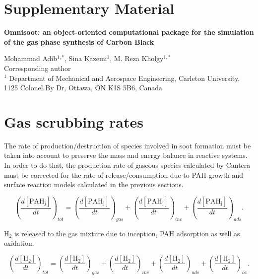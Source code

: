 \section*{Supplementary Material}

\begin{center}
	\vspace*{1cm} %
	\textbf{\LARGE 		Omnisoot: an object-oriented computational package for the simulation of the gas phase synthesis of Carbon Black} 
\end{center}

\begin{center}
	Mohammad Adib$^{1,*}$, Sina Kazemi$^1$, M. Reza Kholgy$^{1,*}$ \\
	{\small *Corresponding author} \\
	$^1$ Department of Mechanical and Aerospace Engineering, Carleton University, 1125 Colonel By Dr, Ottawa, ON K1S 5B6, Canada
\end{center}

\beginsupplement


\section{Gas scrubbing rates}
\label{sec:gasscrub}

The rate of production/destruction of species involved in soot formation must be taken into account to preserve the mass and energy balance in reactive systems. In order to do that, the production rate of gaseous species calculated by Cantera must be corrected for the rate of release/consumption due to PAH growth and surface reaction models calculated in the previous sections.

\begin{equation}
	\left(
	\frac{d\left[{\mathrm{PAH_j}}\right]}{dt}
	\right)_{tot}
	= 
	\left(
	\frac{d\left[{\mathrm{PAH_j}}\right]}{dt}
	\right)_{gas}
	+
	\left(
	\frac{d\left[{\mathrm{PAH_j}}\right]}{dt}
	\right)_{inc}
	+
	\left(
	\frac{d\left[{\mathrm{PAH_j}}\right]}{dt}
	\right)_{ads}
	\label{eqn:PAHscrub_total}.
\end{equation}

$\mathrm{H_2}$ is released to the gas mixture due to inception, PAH adsorption as well as oxidation.

\begin{equation}
	\left(
	\frac{d\left[{\mathrm{H_2}}\right]}{dt}
	\right)_{tot}
	= 
	\left(
	\frac{d\left[{\mathrm{H_2}}\right]}{dt}
	\right)_{gas}
	+
	\left(
	\frac{d\left[{\mathrm{H_2}}\right]}{dt}
	\right)_{inc}
	+
	\left(
	\frac{d\left[{\mathrm{H_2}}\right]}{dt}
	\right)_{ads}
	+
	\left(
	\frac{d\left[{\mathrm{H_2}}\right]}{dt}
	\right)_{ox}
	\label{eqn:H2scrub_total}.
\end{equation}

